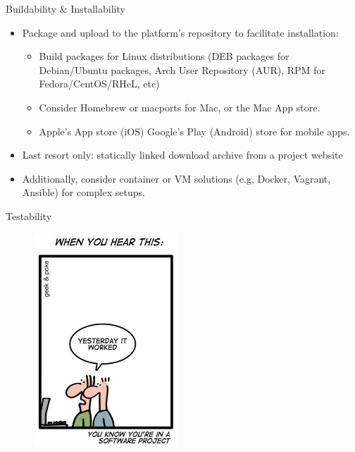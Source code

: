\documentclass[compress]{beamer}
\begin{document}
\begin{frame}{Buildability \& Installability}
    \begin{itemize}
        \item Package and upload to the platform's repository to facilitate
            installation:
            \begin{itemize}
                \item Build packages for Linux distributions (DEB packages for
                        Debian/Ubuntu packages, Arch User Repository (AUR), RPM
                    for Fedora/CentOS/RHeL, etc)
                \item Consider Homebrew or macports for Mac, or the Mac App store.
                \item Apple's App store (iOS) Google's Play (Android) store for mobile apps.
            \end{itemize}        
        \item Last resort only: statically linked download archive from a project website
        \item Additionally, consider container or VM solutions (e.g, Docker, Vagrant, Ansible) for complex setups.
    \end{itemize}
\end{frame}

\begin{frame}{Testability}
\begin{figure}
\includegraphics[height=8cm]{img/test3.jpg}
\end{figure}
\end{frame}
\end{document}
